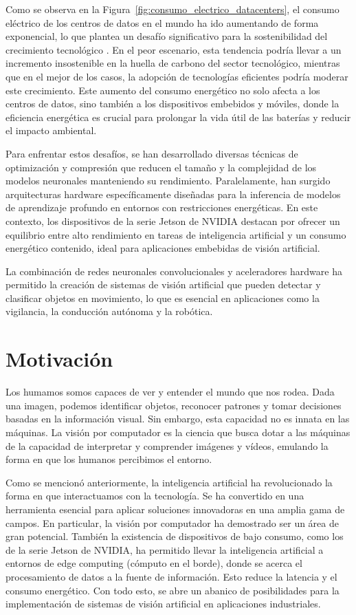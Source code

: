 \documentclass[11pt,spanish,listoffigures,listoftables]{tfgetsinf}
\begin{document}
Como se observa en la Figura~\ref{fig:consumo_electrico_datacenters}, el consumo eléctrico de los centros de datos en el mundo ha ido aumentando de forma exponencial, lo que plantea un desafío significativo para la sostenibilidad del crecimiento tecnológico \cite{challe6010117}. En el peor escenario, esta tendencia podría llevar a un incremento insostenible en la huella de carbono del sector tecnológico, mientras que en el mejor de los casos, la adopción de tecnologías eficientes podría moderar este crecimiento. Este aumento del consumo energético no solo afecta a los centros de datos, sino también a los dispositivos embebidos y móviles, donde la eficiencia energética es crucial para prolongar la vida útil de las baterías y reducir el impacto ambiental.

Para enfrentar estos desafíos, se han desarrollado diversas técnicas de optimización y compresión que reducen el tamaño y la complejidad de los modelos neuronales manteniendo su rendimiento. Paralelamente, han surgido arquitecturas hardware específicamente diseñadas para la inferencia de modelos de aprendizaje profundo en entornos con restricciones energéticas. En este contexto, los dispositivos de la serie Jetson de NVIDIA destacan por ofrecer un equilibrio entre alto rendimiento en tareas de inteligencia artificial y un consumo energético contenido, ideal para aplicaciones embebidas de visión artificial.

La combinación de redes neuronales convolucionales y aceleradores hardware ha permitido la creación de sistemas de visión artificial que pueden detectar y clasificar objetos en movimiento, lo que es esencial en aplicaciones como la vigilancia, la conducción autónoma y la robótica.

\section{Motivaci\'on}

Los humamos somos capaces de ver y entender el mundo que nos rodea. Dada una imagen, podemos identificar objetos, reconocer patrones y tomar decisiones basadas en la información visual. Sin embargo, esta capacidad no es innata en las máquinas. La visión por computador es la ciencia que busca dotar a las máquinas de la capacidad de interpretar y comprender imágenes y vídeos, emulando la forma en que los humanos percibimos el entorno. 

Como se mencionó anteriormente, la inteligencia artificial ha revolucionado la forma en que interactuamos con la tecnología. Se ha convertido en una herramienta esencial para aplicar soluciones innovadoras en una amplia gama de campos. En particular, la visión por computador ha demostrado ser un área de gran potencial. También la existencia de dispositivos de bajo consumo, como los de la serie Jetson de NVIDIA, ha permitido llevar la inteligencia artificial a entornos de edge computing (cómputo en el borde), donde se acerca el procesamiento de datos a la fuente de información. Esto reduce la latencia y el consumo energético. Con todo esto, se abre un abanico de posibilidades para la implementación de sistemas de visión artificial en aplicaciones industriales.
\end{document}
